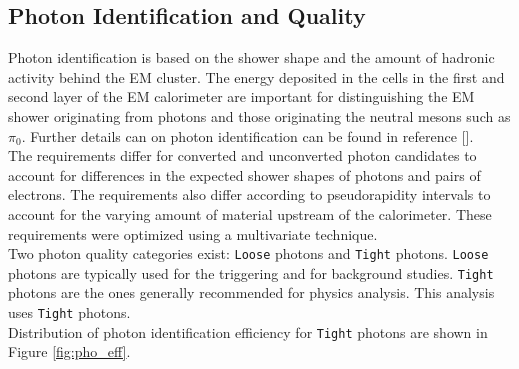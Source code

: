 \subsection{Photon Identification and Quality}
\label{sec:reco:photoID}

\indent Photon identification is based on the shower shape and the amount of hadronic activity behind the EM cluster.  The energy deposited in the cells in the first and second layer of the EM calorimeter are important for distinguishing the EM shower originating from photons and those originating the neutral mesons such as $\pi_0$. Further details can on photon identification can be found in reference [\cite{photonID}]. \\

\indent The requirements differ for converted and unconverted photon candidates to account for differences in the expected shower shapes of photons and pairs of electrons.  The requirements also differ according to pseudorapidity intervals to account for the varying amount of material upstream of the calorimeter. These requirements were optimized using a multivariate technique.\cite{TMVA}\\

\indent Two photon quality categories exist: {\tt Loose} photons and {\tt Tight} photons.  {\tt Loose} photons are typically used for the triggering and for background studies. {\tt Tight} photons are the ones generally recommended for physics analysis.  This analysis uses {\tt Tight} photons.  \\


\indent Distribution of photon identification efficiency for {\tt Tight} photons are shown in Figure \ref{fig:pho_eff}. \\

